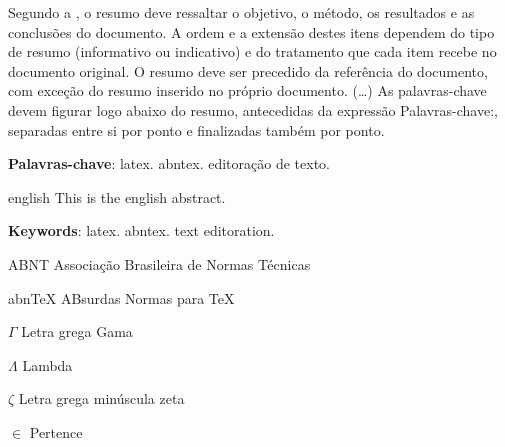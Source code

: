 \documentclass[
12pt,				%
openright,			%
twoside,			%
a4paper,			%
hyphens,
english,			%
brazil				%
]{abntex2}
\begin{document}
	
	\setlength{\absparsep}{18pt} %
	\begin{resumo}
		Segundo a , o resumo deve ressaltar o
		objetivo, o método, os resultados e as conclusões do documento. A ordem e a extensão
		destes itens dependem do tipo de resumo (informativo ou indicativo) e do
		tratamento que cada item recebe no documento original. O resumo deve ser
		precedido da referência do documento, com exceção do resumo inserido no
		próprio documento. (\ldots) As palavras-chave devem figurar logo abaixo do
		resumo, antecedidas da expressão Palavras-chave:, separadas entre si por
		ponto e finalizadas também por ponto.
		
		\textbf{Palavras-chave}: latex. abntex. editoração de texto.
	\end{resumo}
	
	\begin{resumo}[Abstract]
		\begin{otherlanguage*}{english}
			This is the english abstract.
			
			\vspace{\onelineskip}
			
			\noindent 
			\textbf{Keywords}: latex. abntex. text editoration.
		\end{otherlanguage*}
	\end{resumo}
	
	\listoffigures*
	\cleardoublepage
	
	\listoftables*
	\cleardoublepage
	
	\begin{siglas}
		\item[ABNT] Associação Brasileira de Normas Técnicas
		\item[abnTeX] ABsurdas Normas para TeX
	\end{siglas}
	
	\begin{simbolos}
		\item[$ \Gamma $] Letra grega Gama
		\item[$ \Lambda $] Lambda
		\item[$ \zeta $] Letra grega minúscula zeta
		\item[$ \in $] Pertence
	\end{simbolos}
	
\end{document}
